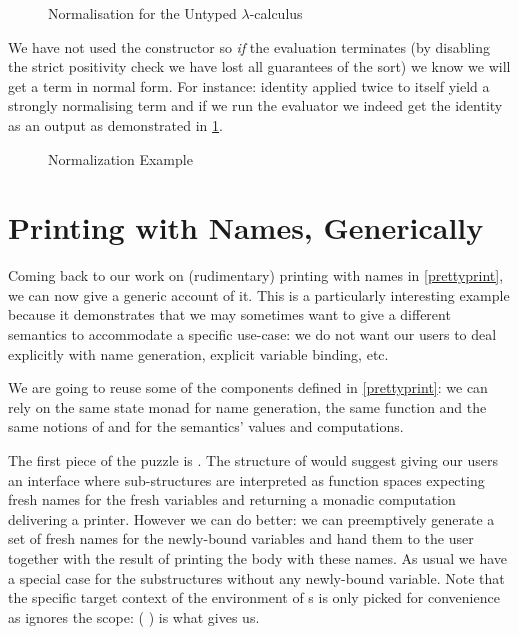 \begin{figure}[h]
\caption{Normalisation for the Untyped $\lambda$-calculus}
\end{figure}

We have not used the  constructor so \emph{if} the evaluation terminates
(by disabling the strict positivity check we have lost all guarantees of the sort)
we know we will get a term in normal form. For instance: identity applied twice
to itself yield a strongly normalising term and if we run the evaluator we indeed
get the identity as an output as demonstrated in \cref{fig:normid3}.

\begin{figure}[h]
\caption{Normalization Example\label{fig:normid3}}
\end{figure}


\section{Printing with Names, Generically}

Coming back to our work on (rudimentary) printing with names in \cref{prettyprint},
we can now give a generic account of it. This is a particularly interesting example
because it demonstrates that we may sometimes want to give  a different
semantics to accommodate a specific use-case: we do not want our users to deal explicitly
with name generation, explicit variable binding, etc.

We are going to reuse some of the components defined in \cref{prettyprint}: we can
rely on the same state monad for name generation, the same  function and
the same notions of  and  for the semantics' values and
computations.

The first piece of the puzzle is . The structure of  would
suggest giving our users an interface where sub-structures are interpreted as 
function spaces expecting fresh names for the fresh variables and returning a monadic
computation delivering a printer. However we can do better: we can preemptively generate
a set of fresh names for the newly-bound variables and hand them to the user together
with the result of printing the body with these names. As usual we have a special case
for the substructures without any newly-bound variable. Note that the specific target
context of the environment of s is only picked for convenience as 
ignores the scope: ({ \AF{++} }) is what  gives us.

